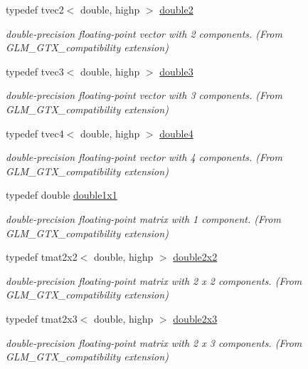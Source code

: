 \begin{DoxyCompactItemize}
typedef tvec2$<$ double, highp $>$ \hyperlink{group__gtx__compatibility_ga490652005dad57a41887b974195f36c1}{double2}
\begin{DoxyCompactList}\small\item\em double-\/precision floating-\/point vector with 2 components. (From G\+L\+M\+\_\+\+G\+T\+X\+\_\+compatibility extension) \end{DoxyCompactList}\item 
typedef tvec3$<$ double, highp $>$ \hyperlink{group__gtx__compatibility_ga80c4961ce61e918f21c1546d43aea2f0}{double3}
\begin{DoxyCompactList}\small\item\em double-\/precision floating-\/point vector with 3 components. (From G\+L\+M\+\_\+\+G\+T\+X\+\_\+compatibility extension) \end{DoxyCompactList}\item 
typedef tvec4$<$ double, highp $>$ \hyperlink{group__gtx__compatibility_ga43d433fc74b24a45801e2be74e7f6fca}{double4}
\begin{DoxyCompactList}\small\item\em double-\/precision floating-\/point vector with 4 components. (From G\+L\+M\+\_\+\+G\+T\+X\+\_\+compatibility extension) \end{DoxyCompactList}\item 
typedef double \hyperlink{group__gtx__compatibility_ga1c87d3042377335eb050a20ab0ec148a}{double1x1}
\begin{DoxyCompactList}\small\item\em double-\/precision floating-\/point matrix with 1 component. (From G\+L\+M\+\_\+\+G\+T\+X\+\_\+compatibility extension) \end{DoxyCompactList}\item 
typedef tmat2x2$<$ double, highp $>$ \hyperlink{group__gtx__compatibility_ga7651d80f2dcc222a2e229ce44af96f11}{double2x2}
\begin{DoxyCompactList}\small\item\em double-\/precision floating-\/point matrix with 2 x 2 components. (From G\+L\+M\+\_\+\+G\+T\+X\+\_\+compatibility extension) \end{DoxyCompactList}\item 
typedef tmat2x3$<$ double, highp $>$ \hyperlink{group__gtx__compatibility_ga60ae0f5858d498b2e5b9bb8d23019db0}{double2x3}
\begin{DoxyCompactList}\small\item\em double-\/precision floating-\/point matrix with 2 x 3 components. (From G\+L\+M\+\_\+\+G\+T\+X\+\_\+compatibility extension) \end{DoxyCompactList}\item 

\end{DoxyCompactItemize}

